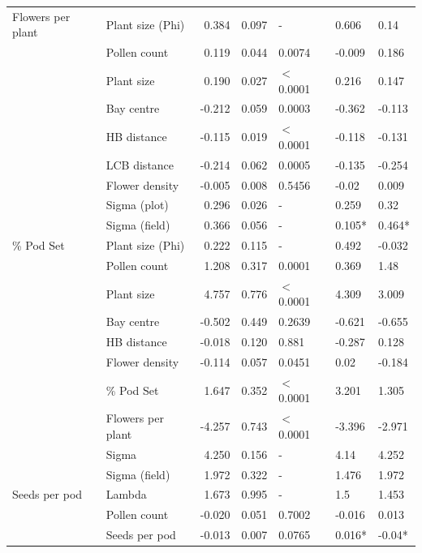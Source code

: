 \documentclass[12pt]{article} %
\begin{document}
\begin{longtable}{l|l|r|r|l|l|l}
\cline{2-7}
\multirow{-5}{*}{\raggedright\arraybackslash Flowers per plant} & Plant size (Phi) & 0.384 & 0.097 & - & 0.606 & 0.14\\
\cline{1-7}
 & Pollen count & 0.119 & 0.044 & 0.0074 & -0.009 & 0.186\\
\cline{2-7}
 & Plant size & 0.190 & 0.027 & $<$0.0001 & 0.216 & 0.147\\
\cline{2-7}
 & Bay centre & -0.212 & 0.059 & 0.0003 & -0.362 & -0.113\\
\cline{2-7}
 & HB distance & -0.115 & 0.019 & $<$0.0001 & -0.118 & -0.131\\
\cline{2-7}
 & LCB distance & -0.214 & 0.062 & 0.0005 & -0.135 & -0.254\\
\cline{2-7}
 & Flower density & -0.005 & 0.008 & 0.5456 & -0.02 & 0.009\\
\cline{2-7}
 & Sigma (plot) & 0.296 & 0.026 & - & 0.259 & 0.32\\
\cline{2-7}
 & Sigma (field) & 0.366 & 0.056 & - & 0.105* & 0.464*\\
\cline{2-7}
\multirow{-9}{*}{\raggedright\arraybackslash \% Pod Set} & Plant size (Phi) & 0.222 & 0.115 & - & 0.492 & -0.032\\
\cline{1-7}
 & Pollen count & 1.208 & 0.317 & 0.0001 & 0.369 & 1.48\\
\cline{2-7}
 & Plant size & 4.757 & 0.776 & $<$0.0001 & 4.309 & 3.009\\
\cline{2-7}
 & Bay centre & -0.502 & 0.449 & 0.2639 & -0.621 & -0.655\\
\cline{2-7}
 & HB distance & -0.018 & 0.120 & 0.881 & -0.287 & 0.128\\
\cline{2-7}
 & Flower density & -0.114 & 0.057 & 0.0451 & 0.02 & -0.184\\
\cline{2-7}
 & \% Pod Set & 1.647 & 0.352 & $<$0.0001 & 3.201 & 1.305\\
\cline{2-7}
 & Flowers per plant & -4.257 & 0.743 & $<$0.0001 & -3.396 & -2.971\\
\cline{2-7}
 & Sigma & 4.250 & 0.156 & - & 4.14 & 4.252\\
\cline{2-7}
 & Sigma (field) & 1.972 & 0.322 & - & 1.476 & 1.972\\
\cline{2-7}
\multirow{-10}{*}{\raggedright\arraybackslash Seeds per pod} & Lambda & 1.673 & 0.995 & - & 1.5 & 1.453\\
\cline{1-7}
 & Pollen count & -0.020 & 0.051 & 0.7002 & -0.016 & 0.013\\
\cline{2-7}
 & Seeds per pod & -0.013 & 0.007 & 0.0765 & 0.016* & -0.04*\\

\end{longtable}
\end{document}
